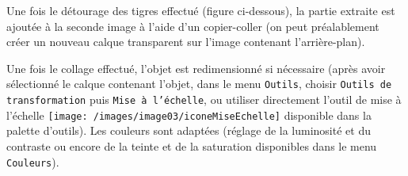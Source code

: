 Une fois le détourage des tigres effectué (figure ci-dessous), la partie extraite est ajoutée à la seconde image à l'aide d'un copier-coller (on peut préalablement créer un nouveau calque transparent sur l'image contenant l'arrière-plan). 


Une fois le collage effectué, l'objet est redimensionné si nécessaire (après avoir sélectionné le calque contenant l'objet, dans le menu \texttt{Outils}, choisir \texttt{Outils de transformation} puis \texttt{Mise à l'échelle}, ou utiliser directement l'outil de mise à l'échelle \texttt{[image: /images/image03/iconeMiseEchelle]} disponible dans la palette d'outils). Les couleurs sont adaptées (réglage de la luminosité et du contraste ou encore de la teinte et de la saturation disponibles dans le menu \texttt{Couleurs}).



